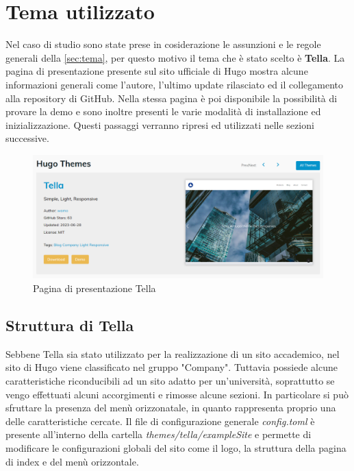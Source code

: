 \documentclass[target=bach,aauheader=]{thud}
\begin{document}
\section{Tema utilizzato}
Nel caso di studio sono state prese in cosiderazione le assunzioni e le regole generali della \cref{sec:tema}, per questo motivo il tema che è stato scelto è \textbf{Tella}.
La pagina di presentazione presente sul sito ufficiale di Hugo mostra alcune informazioni generali come l'autore, l'ultimo update rilasciato ed il collegamento alla repository di GitHub.
\newline
Nella stessa pagina è poi disponibile la possibilità di provare la demo e sono inoltre presenti le varie modalità di installazione ed inizializzazione. Questi passaggi verranno ripresi ed utilizzati nelle sezioni successive.

\begin{figure}
    \centering
    \includegraphics[width = 1\textwidth]{images/Tella.png}
    \caption{Pagina di presentazione Tella}
\end{figure}


\subsection{Struttura di Tella}
Sebbene Tella sia stato utilizzato per la realizzazione di un sito accademico, nel sito di Hugo viene classificato nel gruppo "Company". Tuttavia possiede alcune caratteristiche riconducibili ad un sito adatto per un'università, soprattutto se vengo effettuati alcuni accorgimenti
e rimosse alcune sezioni. 
In particolare si può sfruttare la presenza del menù orizzonatale, in quanto rappresenta proprio una delle caratteristiche cercate. 
\newline
Il file di configurazione generale \textit{config.toml} è presente all'interno della cartella \textit{themes/tella/exampleSite} e permette di modificare le configurazioni globali del sito come il logo, la struttura della pagina di index e del menù orizzontale.
\end{document}
